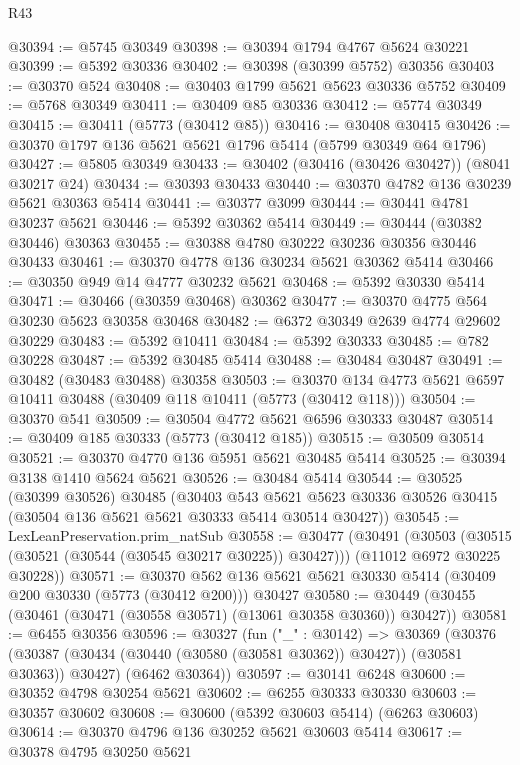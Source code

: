 \begin{lexlean}{R43}
\begin{coremodule}
@30394 := @5745 @30349
@30398 := @30394 @1794 @4767 @5624 @30221
@30399 := @5392 @30336
@30402 := @30398 (@30399 @5752) @30356
@30403 := @30370 @524
@30408 := @30403 @1799 @5621 @5623 @30336 @5752
@30409 := @5768 @30349
@30411 := @30409 @85 @30336
@30412 := @5774 @30349
@30415 := @30411 (@5773 (@30412 @85))
@30416 := @30408 @30415
@30426 := @30370 @1797 @136 @5621 @5621 @1796 @5414 (@5799 @30349 @64 @1796)
@30427 := @5805 @30349
@30433 := @30402 (@30416 (@30426 @30427)) (@8041 @30217 @24)
@30434 := @30393 @30433
@30440 := @30370 @4782 @136 @30239 @5621 @30363 @5414
@30441 := @30377 @3099
@30444 := @30441 @4781 @30237 @5621
@30446 := @5392 @30362 @5414
@30449 := @30444 (@30382 @30446) @30363
@30455 := @30388 @4780 @30222 @30236 @30356 @30446 @30433
@30461 := @30370 @4778 @136 @30234 @5621 @30362 @5414
@30466 := @30350 @949 @14 @4777 @30232 @5621
@30468 := @5392 @30330 @5414
@30471 := @30466 (@30359 @30468) @30362
@30477 := @30370 @4775 @564 @30230 @5623 @30358 @30468
@30482 := @6372 @30349 @2639 @4774 @29602 @30229
@30483 := @5392 @10411
@30484 := @5392 @30333
@30485 := @782 @30228
@30487 := @5392 @30485 @5414
@30488 := @30484 @30487
@30491 := @30482 (@30483 @30488) @30358
@30503 := @30370 @134 @4773 @5621 @6597 @10411 @30488 (@30409 @118 @10411 (@5773 (@30412 @118)))
@30504 := @30370 @541
@30509 := @30504 @4772 @5621 @6596 @30333 @30487
@30514 := @30409 @185 @30333 (@5773 (@30412 @185))
@30515 := @30509 @30514
@30521 := @30370 @4770 @136 @5951 @5621 @30485 @5414
@30525 := @30394 @3138 @1410 @5624 @5621
@30526 := @30484 @5414
@30544 := @30525
    (@30399 @30526)
    @30485
    (@30403
      @543
      @5621
      @5623
      @30336
      @30526
      @30415
      (@30504 @136 @5621 @5621 @30333 @5414 @30514 @30427))
@30545 := LexLeanPreservation.prim_natSub
@30558 := @30477
    (@30491
      (@30503 (@30515 (@30521 (@30544 (@30545 @30217 @30225)) @30427)))
      (@11012 @6972 @30225 @30228))
@30571 := @30370
    @562
    @136
    @5621
    @5621
    @30330
    @5414
    (@30409 @200 @30330 (@5773 (@30412 @200)))
    @30427
@30580 := @30449 (@30455 (@30461 (@30471 (@30558 @30571) (@13061 @30358 @30360)) @30427))
@30581 := @6455 @30356
@30596 := @30327
    (fun ("_" : @30142) =>
    @30369
      (@30376 (@30387 (@30434 (@30440 (@30580 (@30581 @30362)) @30427)) (@30581 @30363)) @30427)
      (@6462 @30364))
@30597 := @30141 @6248
@30600 := @30352 @4798 @30254 @5621
@30602 := @6255 @30333 @30330
@30603 := @30357 @30602
@30608 := @30600 (@5392 @30603 @5414) (@6263 @30603)
@30614 := @30370 @4796 @136 @30252 @5621 @30603 @5414
@30617 := @30378 @4795 @30250 @5621

\end{coremodule}
\end{lexlean}
